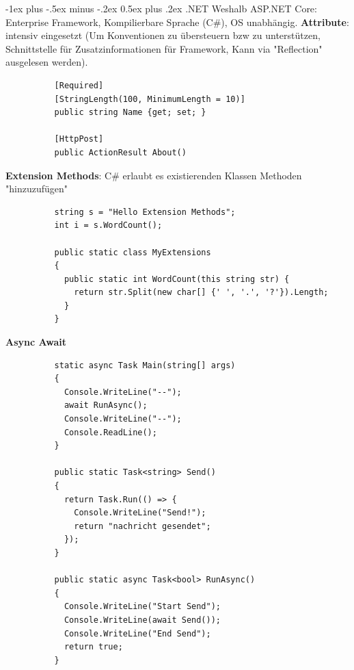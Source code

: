 \documentclass[10pt,landscape]{article}
\makeatletter
\renewcommand{\section}{\@startsection{section}{1}{0mm}%
{-1ex plus -.5ex minus -.2ex}%
{0.5ex plus .2ex}%
{\normalfont\large\bfseries}}
\makeatother
\begin{document}
\begin{multicols}{3}
        \section{.NET}
        Weshalb ASP.NET Core: Enterprise Framework, Kompilierbare Sprache (C\#), OS unabhängig.
        \textbf{Attribute}: intensiv eingesetzt (Um Konventionen zu übersteuern bzw zu unterstützen, Schnittstelle für Zusatzinformationen für Framework, Kann via "Reflection" ausgelesen werden).
        \begin{lstlisting}
          [Required]
          [StringLength(100, MinimumLength = 10)]
          public string Name {get; set; }

          [HttpPost]
          public ActionResult About()
        \end{lstlisting}

        \textbf{Extension Methods}: C\# erlaubt es existierenden Klassen Methoden "hinzuzufügen"
        \begin{lstlisting}
          string s = "Hello Extension Methods";
          int i = s.WordCount();

          public static class MyExtensions
          {
            public static int WordCount(this string str) {
              return str.Split(new char[] {' ', '.', '?'}).Length;
            }
          }
        \end{lstlisting}

        \textbf{Async Await}
        \begin{lstlisting}
          static async Task Main(string[] args)
          {
            Console.WriteLine("--");
            await RunAsync();
            Console.WriteLine("--");
            Console.ReadLine();
          }

          public static Task<string> Send()
          {
            return Task.Run(() => {
              Console.WriteLine("Send!");
              return "nachricht gesendet";
            });
          }

          public static async Task<bool> RunAsync()
          {
            Console.WriteLine("Start Send");
            Console.WriteLine(await Send());
            Console.WriteLine("End Send");
            return true;
          }


\end{lstlisting}
\end{multicols}
\end{document}
